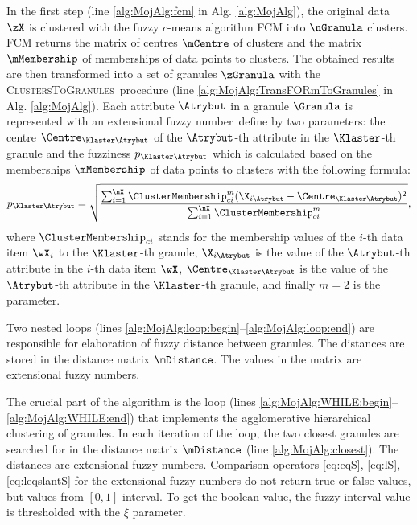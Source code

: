 \documentclass{amcs}
\newcommand{\procedura}[1]{\textsc{#1}}
\newcommand{\CtoG}{\procedura{ClustersToGranules}}
\newcommand{\efn}{extensional fuzzy number}
\begin{document}
In the first step (line \ref{alg:MojAlg:fcm} in Alg. \ref{alg:MojAlg}), the original data $\zX$ is clustered with the fuzzy $c$-means algorithm FCM into $\nGranula$ clusters. 
FCM returns the matrix of centres $\mCentre$ of   clusters and the matrix $\mMembership$ of memberships of data points to clusters.
The obtained results are then transformed into a set of granules $\zGranula$ with the \CtoG\ procedure (line \ref{alg:MojAlg:TransFORmToGranules} in Alg. \ref{alg:MojAlg}).
%
Each attribute $\Atrybut$ in a granule $\Granula$ is represented with an \efn\ define by two parameters:
the centre  $\Centre_{\Klaster\Atrybut}$ of the $\Atrybut$-th attribute in the $\Klaster$-th granule
and 
the fuzziness $p_{\Klaster\Atrybut}$ which is calculated based on the memberships $\mMembership$ of data points to clusters with the following formula:
 \begin{align}
 	p_{\Klaster \Atrybut} = \sqrt{\frac{\sum_{i = 1}^{\nX} \ClusterMembership_{\klaster i}^{m} (\X_{i\Atrybut} - \Centre_{\Klaster\Atrybut})^{2}}{\sum_{i = 1}^{\nX} \ClusterMembership_{\klaster i}^{m}}},
\end{align} 
where 
$\ClusterMembership_{\klaster i}$ stands for the membership values of the $i$-th data item $\wX_i$ to the $\Klaster$-th granule,
$\X_{i \Atrybut}$ is the value of the $\Atrybut$-th attribute in the $i$-th data item $\wX$, 
$\Centre_{\Klaster\Atrybut}$ is the value of the $\Atrybut$-th attribute in the $\Klaster$-th granule,
and finally $m=2$ is the parameter.


Two nested loops  (lines \ref{alg:MojAlg:loop:begin}--\ref{alg:MojAlg:loop:end}) are responsible for elaboration of fuzzy distance between granules. 
The distances are stored in the distance matrix $\mDistance$. 
The values in the matrix are \efn s.

The crucial part of the algorithm is the  loop (lines \ref{alg:MojAlg:WHILE:begin}--\ref{alg:MojAlg:WHILE:end}) that implements the agglomerative hierarchical clustering of granules.
In each iteration of the loop, the two closest granules are searched for in the distance matrix $\mDistance$ (line \ref{alg:MojAlg:closest}).
The distances are \efn s. 
Comparison operators 
\eqref{eq:eqS},
\eqref{eq:lS},
\eqref{eq:leqslantS}
 for the \efn s do not return true or false values, but values from $[0,1]$ interval. 
To get the boolean value, the fuzzy interval value is thresholded with the $\xi$ parameter.
\end{document}
